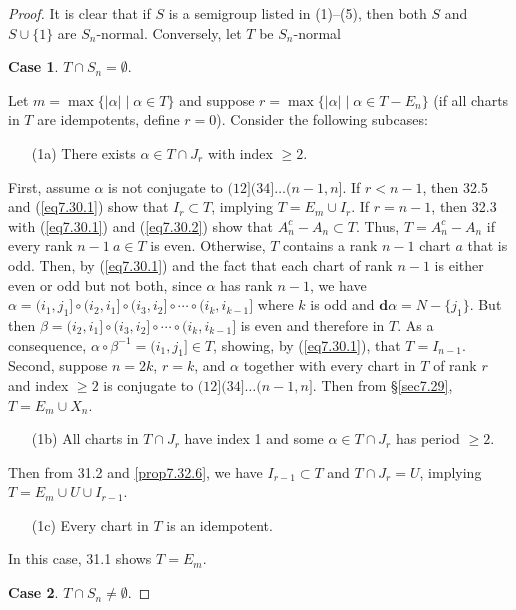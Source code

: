 \documentclass{surv-l}
\numberwithin{equation}{section}
\numberwithin{table}{section}
\numberwithin{figure}{section}
\theoremstyle{plain}
\theoremstyle{definition}
\begin{document}
\begin{proof} It is clear that if $S$ is a semigroup listed in (1)--(5),
then both $S$ and $S \cup\{1\}$ are $S_{n}$-normal.
Conversely, let $T$ be $S_{n}$-normal

\noindent \textbf{Case 1}. $T\cap S_{n}=\emptyset$.

\noindent Let $m=\max\{|\alpha|\mid \alpha\in T\}$ and suppose
$r=\max\{|\alpha|\mid \alpha\in T-E_{n}\}$ (if all charts in
$T$ are idempotents, define $r=0$). Consider the following
subcases:
\begin{enumerate}
\item[(1a)] There exists $\alpha\in T\cap J_{r}$ with index $\geq 2$.
\end{enumerate}
First, assume $\alpha$ is not conjugate to $(12](34]\ldots (n-1,
n]$. If $r<n -1$, then 32.5 and (\ref{eq7.30.1}) show that
$I_{r}\subset T$, implying $T=E_{m}\cup I_{r}$. If $r=n-1$, then
32.3 with (\ref{eq7.30.1}) and (\ref{eq7.30.2}) show that
$A_{n}^{c}-A_{n}\subset T$. Thus, $T=A_{n}^{c}-A_{n}$ if every
rank $n-1\ a \in T$ is even. Otherwise, $T$ contains a rank $n-1$
chart $a$ that is odd. Then, by (\ref{eq7.30.1}) and the fact that
each chart of rank $n -1$ is either even or odd but not both,
since $\alpha$ has rank $n -1$, we have
$\alpha=(i_{1},j_{1}]\circ(i_{2}, i_{1}]\circ(i_{3},
i_{2}]\circ\cdots\circ(i_{k}, i_{k-1}]$ where $k$ is odd and
$\mathbf{d}\alpha=N-\{j_{1}\}$. But then $\beta=(i_{2},
i_{1}]\circ(i_{3}, i_{2}]\circ\cdots \circ (i_{k}, i_{k-1}]$ is
even and therefore in $T$. As a consequence,
$\alpha\circ\beta^{-1}=(i_{1}, j_{1}]\in T$, showing, by
(\ref{eq7.30.1}), that $T=I_{n-1}$. Second, suppose $n =2k$, $r=k$,
and $\alpha$ together with every chart in $T$ of rank $r$ and
index $\geq 2$ is conjugate to $(12](34]\ldots (n-1, n]$. Then
from \S\ref{sec7.29}, $T=E_{m}\cup X_{n}$.
\begin{enumerate}
\item[(1b)] All charts in $T\cap J_{r}$ have index 1 and some $\alpha\in
T\cap J_{r}$ has period $\geq 2$.
\end{enumerate}
Then from 31.2 and \ref{prop7.32.6}, we have $I_{r-1}\subset T$
and $T\cap J_{r}=U$, implying $T=E_{m}\cup U\cup I_{r-1}$.
\begin{enumerate}
\item[(1c)] Every chart in $T$ is an idempotent.
\end{enumerate}
In this case, 31.1 shows $T=E_{m}$.

\noindent \textbf{Case 2}. $T\cap S_{n}\neq\emptyset$.


\end{proof}
\end{document}

